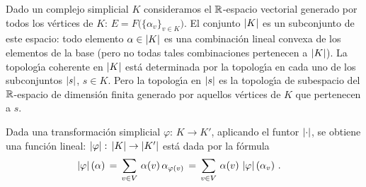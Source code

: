 \begin{obsSimplicialEsLineal}\label{obs:simplicialeslineal}
	Dado un complejo simplicial $K$ consideramos el $\mathbb{R}$-espacio
	vectorial generado por todos los v\'{e}rtices de $K$:
	$E=F\big(\{\alpha_{v}\}_{v\in K}\big)$. El conjunto $\left|K\right|$ es
	un subconjunto de este espacio: todo elemento $\alpha\in\left|K\right|$
	es una combinaci\'{o}n lineal convexa de los elementos de la base
	(pero no todas tales combinaciones pertenecen a $\left|K\right|$).
	La topolog\'{\i}a coherente en $\left|K\right|$ est\'{a} determinada
	por la topolog\'{\i}a en cada uno de los subconjuntos $\left|s\right|$,
	$s\in K$. Pero la topolog\'{\i}a en $\left|s\right|$ es la topolog\'{\i}a
	de subespacio del $\mathbb{R}$-espacio de dimensi\'{o}n finita
	generado por aquellos v\'{e}rtices de $K$ que pertenecen a $s$.

	Dada una transformaci\'{o}n simplicial $\varphi:\,K\rightarrow K'$,
	aplicando el funtor $\left|\cdot\right|$, se obtiene una funci\'{o}n
	lineal: $\left|\varphi\right|:\,\left|K\right|\rightarrow\left|K'\right|$ est\'{a}
	dada por la f\'{o}rmula
	\begin{align*}
		\left|\varphi\right|(\alpha) & \,=\,
			\sum_{v\in V}\,\alpha(v)\,\alpha_{\varphi(v)} \,=\,
			\sum_{v\in V}\,\alpha(v)\,\left|\varphi\right|(\alpha_{v})
		\text{ .}
	\end{align*}
\end{obsSimplicialEsLineal}
